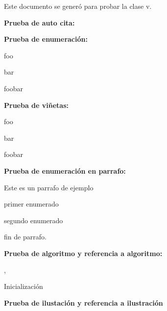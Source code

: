 
Este documento se generó para probar la clase  v\uclamscversion.




\break


\espaciodoble\textbf{Prueba de auto cita:}

\yo

\espaciodoble\textbf{Prueba de enumeración:}

\begin{enumeracion}
	\item foo
	\item bar
	\item foobar
\end{enumeracion}

\espaciodoble\textbf{Prueba de viñetas:}

\begin{vinetas}
	\item foo
	\item bar
	\item foobar
\end{vinetas}

\espaciodoble\textbf{Prueba de enumeración en parrafo:}

Este es un parrafo de ejemplo\begin{enumeracionenparrafo}
\item primer enumerado \item segundo enumerado\end{enumeracionenparrafo}
fin de parrafo.

\break

\espaciodoble\textbf{Prueba de algoritmo y referencia a algoritmo:}

, 

\begin{algoritmo}[fuente=Prueba de fuente, titulo=Algoritmo, indice=Indice del algoritmo, etiqueta=alg]
Inicialización\;
\end{algoritmo}

\break

\espaciodoble\textbf{Prueba de ilustación y referencia a ilustración}

